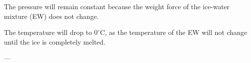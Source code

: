 The pressure will remain constant because the weight force of the ice-water mixture (EW) does not change.  

The temperature will drop to \( 0^\circ\text{C} \), as the temperature of the EW will not change until the ice is completely melted.  

---